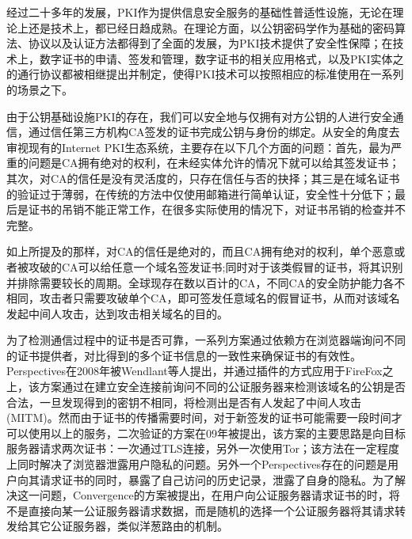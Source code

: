 经过二十多年的发展，PKI作为提供信息安全服务的基础性普适性设施，无论在理论上还是技术上，都已经日趋成熟。在理论方面，以公钥密码学作为基础的密码算法、协议以及认证方法都得到了全面的发展，为PKI技术提供了安全性保障；在技术上，数字证书的申请、签发和管理，数字证书的相关应用格式，以及PKI实体之的通行协议都被相继提出并制定，使得PKI技术可以按照相应的标准使用在一系列的场景之下。


由于公钥基础设施PKI的存在，我们可以安全地与仅拥有对方公钥的人进行安全通信，通过信任第三方机构CA签发的证书完成公钥与身份的绑定。从安全的角度去审视现有的Internet PKI生态系统，主要存在以下几个方面的问题：首先，最为严重的问题是CA拥有绝对的权利，在未经实体允许的情况下就可以给其签发证书；其次，对CA的信任是没有灵活度的，只存在信任与否的抉择；其三是在域名证书的验证过于薄弱，在传统的方法中仅使用邮箱进行简单认证，安全性十分低下；最后是证书的吊销不能正常工作，在很多实际使用的情况下，对证书吊销的检查并不完整\cite{ristic2014bulletproof}。

如上所提及的那样，对CA的信任是绝对的，而且CA拥有绝对的权利，单个恶意或者被攻破的CA可以给任意一个域名签发证书\cite{ducklin2013turktrust};同时对于该类假冒的证书，将其识别并排除需要较长的周期。全球现存在数以百计的CA，不同CA的安全防护能力各不相同，攻击者只需要攻破单个CA，即可签发任意域名的假冒证书，从而对该域名发起中间人攻击，达到攻击相关域名的目的。





为了检测通信过程中的证书是否可靠，一系列方案通过依赖方在浏览器端询问不同的证书提供者，对比得到的多个证书信息的一致性来确保证书的有效性。Perspectives\cite{wendlandt2008perspectives}在2008年被Wendlant等人提出，并通过插件的方式应用于FireFox之上，该方案通过在建立安全连接前询问不同的公证服务器来检测该域名的公钥是否合法，一旦发现得到的密钥不相同，将检测出是否有人发起了中间人攻击(MITM)。然而由于证书的传播需要时间，对于新签发的证书可能需要一段时间才可以使用以上的服务，二次验证\cite{alicherry2009doublecheck}的方案在09年被提出，该方案的主要思路是向目标服务器请求两次证书：一次通过TLS连接，另外一次使用Tor\cite{alicherry2009doublecheck}；该方法在一定程度上同时解决了浏览器泄露用户隐私的问题。另外一个Perspectives存在的问题是用户向其请求证书的同时，暴露了自己访问的历史记录，泄露了自身的隐私。为了解决这一问题，Convergence\cite{convergence}的方案被提出，在用户向公证服务器请求证书的时，将不是直接向某一公证服务器请求数据，而是随机的选择一个公证服务器将其请求转发给其它公证服务器，类似洋葱路由的机制。

